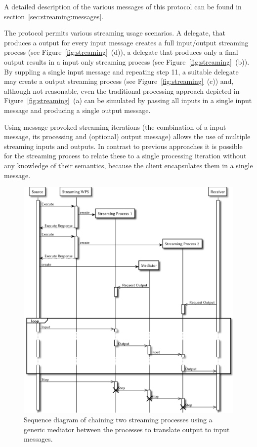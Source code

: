 	A detailed description of the various messages of this protocol can be found in section~\ref{sec:streaming:messages}.

	The protocol permits various streaming usage scenarios. A delegate, that produces a output for every input message creates a full input/output streaming process (see Figure~\ref{fig:streaming}~(d)), a delegate that produces only a final output results in a input only streaming process (see Figure~\ref{fig:streaming}~(b)). By suppling a single input message and repeating step 11, a suitable delegate may create a output streaming process (see Figure~\ref{fig:streaming}~(c)) and, although not reasonable, even the traditional processing approach depicted in Figure~\ref{fig:streaming}~(a) can be simulated by passing all inputs in a single input message and producing a single output message.

	Using message provoked streaming iterations (the combination of a input message, its processing and (optional) output message) allows the use of multiple streaming inputs and outputs. In contrast to previous approaches it is possible for the streaming process to relate these to a single processing iteration without any knowledge of their semantics, because the client encapsulates them in a single message.

	\begin{figure}[!htb]
		\centering
		\includegraphics[width=1\textwidth]{figures/sequence-diagramm-chain.pdf}
		\caption{\label{fig:sd:chain}Sequence diagram of chaining two streaming processes using a generic mediator between the processes to translate output to input messages.}
	\end{figure}

